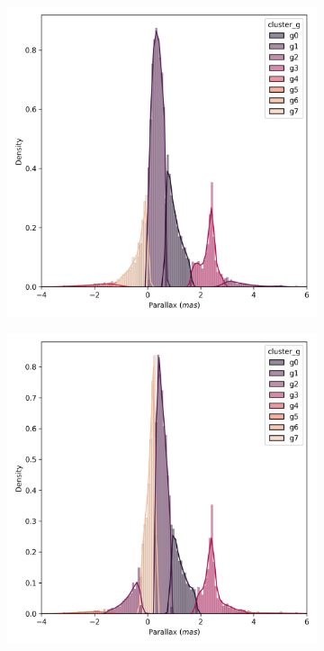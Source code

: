\documentclass[11pt,a4paper,english,twocolumn]{article}
\begin{document}
\begin{figure}[!hbt]
  \begin{subfigure}{0.3\textwidth}
    \includegraphics[width=\textwidth]{../figures/ngc_2516/kmeans_parallax_ngc_2516.png}
  \end{subfigure}
  \begin{subfigure}{0.3\textwidth}
    \includegraphics[width=\textwidth]{../figures/ngc_2516/dec_parallax_ngc_2516.png}

\end{subfigure}
\end{figure}
\end{document}
